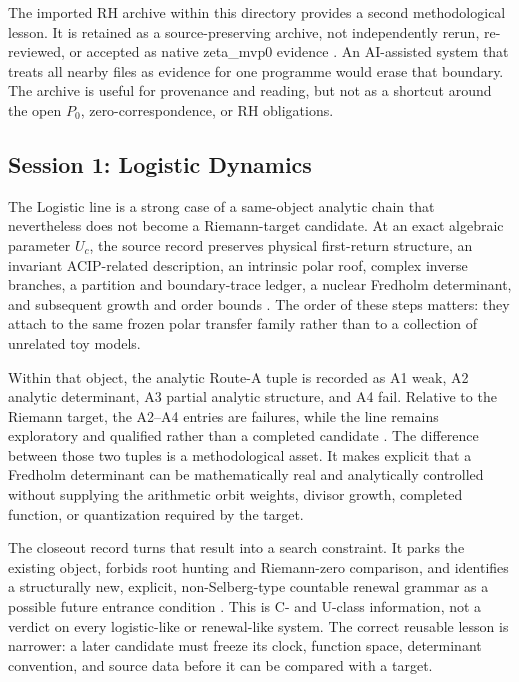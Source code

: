 The imported RH archive within this directory provides a second methodological lesson. It is retained as a source-preserving archive, not independently rerun, re-reviewed, or accepted as native zeta\_mvp0 evidence . An AI-assisted system that treats all nearby files as evidence for one programme would erase that boundary. The archive is useful for provenance and reading, but not as a shortcut around the open \(P_0\), zero-correspondence, or RH obligations.

\hypertarget{session-1-logistic-dynamics}{%
\subsection{Session 1: Logistic Dynamics}\label{session-1-logistic-dynamics}}

The Logistic line is a strong case of a same-object analytic chain that nevertheless does not become a Riemann-target candidate. At an exact algebraic parameter \(U_c\), the source record preserves physical first-return structure, an invariant ACIP-related description, an intrinsic polar roof, complex inverse branches, a partition and boundary-trace ledger, a nuclear Fredholm determinant, and subsequent growth and order bounds . The order of these steps matters: they attach to the same frozen polar transfer family rather than to a collection of unrelated toy models.

Within that object, the analytic Route-A tuple is recorded as A1 weak, A2 analytic determinant, A3 partial analytic structure, and A4 fail. Relative to the Riemann target, the A2--A4 entries are failures, while the line remains exploratory and qualified rather than a completed candidate . The difference between those two tuples is a methodological asset. It makes explicit that a Fredholm determinant can be mathematically real and analytically controlled without supplying the arithmetic orbit weights, divisor growth, completed function, or quantization required by the target.

The closeout record turns that result into a search constraint. It parks the existing object, forbids root hunting and Riemann-zero comparison, and identifies a structurally new, explicit, non-Selberg-type countable renewal grammar as a possible future entrance condition . This is C- and U-class information, not a verdict on every logistic-like or renewal-like system. The correct reusable lesson is narrower: a later candidate must freeze its clock, function space, determinant convention, and source data before it can be compared with a target.

